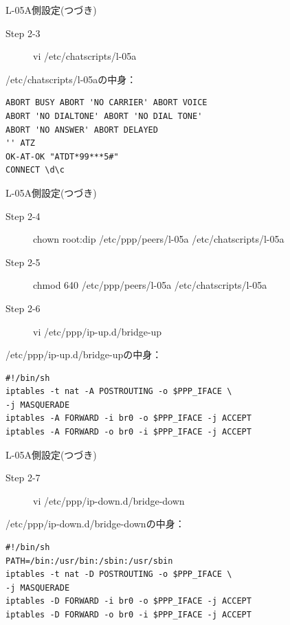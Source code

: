 \begin{frame}[containsverbatim]{L-05A側設定(つづき)}

  \begin{description}
    \item [Step 2-3] vi /etc/chatscripts/l-05a
  \end{description}      
 /etc/chatscripts/l-05aの中身：
\begin{verbatim}
ABORT BUSY ABORT 'NO CARRIER' ABORT VOICE 
ABORT 'NO DIALTONE' ABORT 'NO DIAL TONE' 
ABORT 'NO ANSWER' ABORT DELAYED
'' ATZ
OK-AT-OK "ATDT*99***5#"
CONNECT \d\c
\end{verbatim}
 
\end{frame}

\begin{frame}[containsverbatim]{L-05A側設定(つづき)}

  \begin{description}
    \item [Step 2-4] chown root:dip /etc/ppp/peers/l-05a /etc/chatscripts/l-05a
    \item [Step 2-5] chmod 640 /etc/ppp/peers/l-05a /etc/chatscripts/l-05a
    \item [Step 2-6] vi /etc/ppp/ip-up.d/bridge-up
  \end{description}      
 /etc/ppp/ip-up.d/bridge-upの中身：
\begin{verbatim}
#!/bin/sh
iptables -t nat -A POSTROUTING -o $PPP_IFACE \
-j MASQUERADE
iptables -A FORWARD -i br0 -o $PPP_IFACE -j ACCEPT
iptables -A FORWARD -o br0 -i $PPP_IFACE -j ACCEPT
\end{verbatim}

\end{frame}

\begin{frame}[containsverbatim]{L-05A側設定(つづき)}

  \begin{description}
    \item [Step 2-7] vi /etc/ppp/ip-down.d/bridge-down
  \end{description}      
 /etc/ppp/ip-down.d/bridge-downの中身：
\begin{verbatim}
#!/bin/sh
PATH=/bin:/usr/bin:/sbin:/usr/sbin
iptables -t nat -D POSTROUTING -o $PPP_IFACE \
-j MASQUERADE
iptables -D FORWARD -i br0 -o $PPP_IFACE -j ACCEPT
iptables -D FORWARD -o br0 -i $PPP_IFACE -j ACCEPT
\end{verbatim}

\end{frame}

